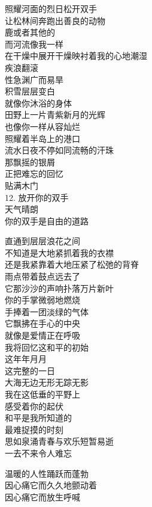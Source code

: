 \documentclass{article}
\begin{document}
照耀河面的烈日松开双手\\
让松林间奔跑出善良的动物\\
鹿或者其他的\\
而河流像我一样\\
在干燥中展开干燥映衬着我的心地潮湿\\
疾浪翻滚
\\
性急渊广而易旱 \\ 


积雪层层变白\\
就像你沐浴的身体\\
田野上一片青紫新月的光辉\\
也像你一样从容灿烂\\
照耀着半岛上的港口\\
流水日夜不停如同流畅的汗珠\\
那飘摇的银屑\\
正把难忘的回忆
\\
贴满木门 \\ 


12. 放开你的双手\\
天气晴朗\\
你的双手是自由的道路\\
\newpage

直通到层层浪花之间\\
不知道是大地紧抓着我的衣襟
\\
还是我紧靠着大地压紧了松弛的背脊 \\ 


雨点带着鼓点远去了\\
它那沙沙的声响扑落万片新叶\\
你的手掌微弱地燃烧\\
手捧着一团淡绿的气体\\
它飘拂在手心的中央
\\
就像是爱情正在呼吸 \\ 


我将回忆这和平的初始\\
这年年月月\\
这完整的一日\\
大海无边无形无踪无影\\
我在这低垂的平野上\\
感受着你的起伏\\
和平是我所知道的\\
最难捉摸的时刻\\
思如泉涌青春与欢乐短暂易逝\\
一去不来令人难忘\\
\newpage

温暖的人性踊跃而蓬勃\\
因心痛它而久久地颤动着
\\
因心痛它而放生呼喊 \\ 
\end{document}
